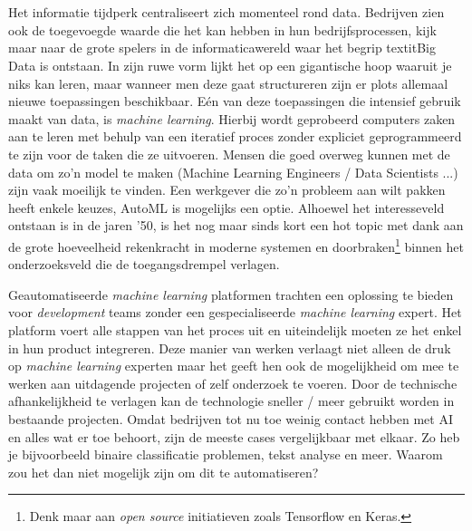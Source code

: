 
\chapter{}
\label{ch:inleiding}

Het informatie tijdperk centraliseert zich momenteel rond data. Bedrijven zien ook de toegevoegde waarde die het kan hebben in hun bedrijfsprocessen, kijk maar naar de grote spelers in de informaticawereld waar het begrip textit{Big Data} is ontstaan. In zijn ruwe vorm lijkt het op een gigantische hoop waaruit je niks kan leren, maar wanneer men deze gaat structureren zijn er plots allemaal nieuwe toepassingen beschikbaar. 
Eén van deze toepassingen die intensief gebruik maakt van data, is \textit{machine learning}. Hierbij wordt geprobeerd computers zaken aan te leren met behulp van een iteratief proces zonder expliciet geprogrammeerd te zijn voor de taken die ze uitvoeren. Mensen die goed overweg kunnen met de data om zo'n model te maken (Machine Learning Engineers / Data Scientists ...)  zijn vaak moeilijk te vinden. Een werkgever die zo'n probleem aan wilt pakken heeft enkele keuzes, AutoML is mogelijks een optie. Alhoewel het interesseveld ontstaan is in de jaren '50, is het nog maar sinds kort een hot topic met dank aan de grote hoeveelheid rekenkracht in moderne systemen en doorbraken\footnote{Denk maar aan \textit{open source} initiatieven zoals Tensorflow en Keras.} binnen het onderzoeksveld die de toegangsdrempel verlagen.

Geautomatiseerde \textit{machine learning} platformen trachten een oplossing te bieden voor \textit{development} teams zonder een gespecialiseerde \textit{machine learning} expert. Het platform voert alle stappen van het proces uit en uiteindelijk moeten ze het enkel in hun product integreren. Deze manier van werken verlaagt niet alleen de druk op \textit{machine learning} experten maar het geeft hen ook de mogelijkheid om mee te werken aan uitdagende projecten of zelf onderzoek te voeren. Door de technische afhankelijkheid te verlagen kan de technologie sneller / meer gebruikt worden in bestaande projecten. Omdat bedrijven tot nu toe weinig contact hebben met AI en alles wat er toe behoort, zijn de meeste cases vergelijkbaar met elkaar. Zo heb je bijvoorbeeld binaire classificatie problemen, tekst analyse en meer. Waarom zou het dan niet mogelijk zijn om dit te automatiseren? 

